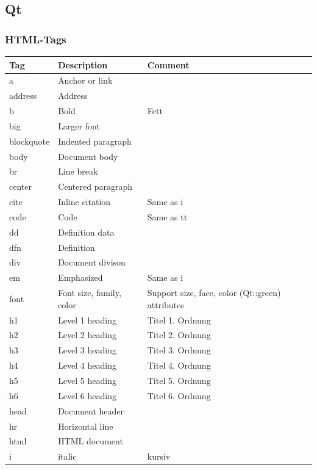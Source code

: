 \subsection{Qt}
\subsubsection{HTML-Tags}

\begin{longtable}{| p{} | p{} | p{}|}
	\hline \textbf{Tag} & \textbf{Description} & \textbf{Comment}\\
	\hline a& Anchor or link& \\
	\hline address & Address &\\
	\hline b& Bold & Fett\\
	\hline big & Larger font&\\
	\hline blockquote & Indented paragraph&\\
	\hline body & Document body &\\
	\hline br & Line break &\\
	\hline center & Centered paragraph&\\
	\hline cite & Inline citation & Same as i\\
	\hline code & Code& Same as tt\\
	\hline dd & Definition data & \\
	\hline dfn & Definition & \\
	\hline div& Document divison&\\
	\hline em& Emphasized& Same as i\\
	\hline font& Font size, family, color& Support size, face, color (Qt::green) attributes\\
	\hline h1 & Level 1 heading& Titel 1. Ordnung\\
	\hline h2 & Level 2 heading& Titel 2. Ordnung\\
	\hline h3 & Level 3 heading& Titel 3. Ordnung\\
	\hline h4 & Level 4 heading& Titel 4. Ordnung\\
	\hline h5 & Level 5 heading& Titel 5. Ordnung\\
	\hline h6 & Level 6 heading& Titel 6. Ordnung\\
	\hline head & Document header&\\
	\hline hr & Horizontal line&\\
	\hline html & HTML document&\\
	\hline i & italic& kursiv\\

\end{longtable}
